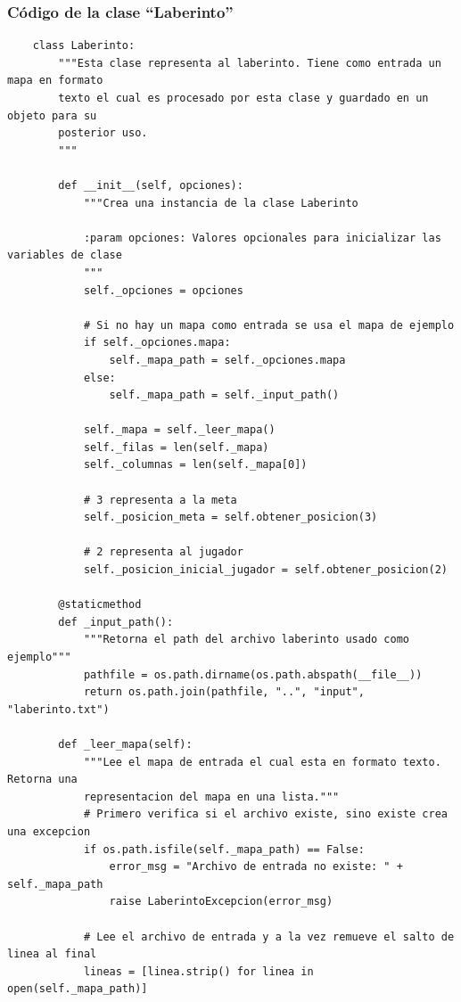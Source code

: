 \documentclass[letter, titlepage, 10pt]{article}
\begin{document}
\subsubsection{Código de la clase ``Laberinto''}
\begin{lstlisting}
    class Laberinto:
        """Esta clase representa al laberinto. Tiene como entrada un mapa en formato 
        texto el cual es procesado por esta clase y guardado en un objeto para su 
        posterior uso.
        """
        
        def __init__(self, opciones):
            """Crea una instancia de la clase Laberinto
            
            :param opciones: Valores opcionales para inicializar las variables de clase
            """
            self._opciones = opciones
    
            # Si no hay un mapa como entrada se usa el mapa de ejemplo
            if self._opciones.mapa:
                self._mapa_path = self._opciones.mapa
            else:
                self._mapa_path = self._input_path()
    
            self._mapa = self._leer_mapa()
            self._filas = len(self._mapa)
            self._columnas = len(self._mapa[0])
    
            # 3 representa a la meta
            self._posicion_meta = self.obtener_posicion(3)
    
            # 2 representa al jugador
            self._posicion_inicial_jugador = self.obtener_posicion(2)
    
        @staticmethod
        def _input_path():
            """Retorna el path del archivo laberinto usado como ejemplo"""
            pathfile = os.path.dirname(os.path.abspath(__file__))
            return os.path.join(pathfile, "..", "input", "laberinto.txt")
    
        def _leer_mapa(self):
            """Lee el mapa de entrada el cual esta en formato texto. Retorna una 
            representacion del mapa en una lista."""
            # Primero verifica si el archivo existe, sino existe crea una excepcion
            if os.path.isfile(self._mapa_path) == False:
                error_msg = "Archivo de entrada no existe: " + self._mapa_path
                raise LaberintoExcepcion(error_msg)
    
            # Lee el archivo de entrada y a la vez remueve el salto de linea al final
            lineas = [linea.strip() for linea in open(self._mapa_path)]
    

\end{lstlisting}
\end{document}
